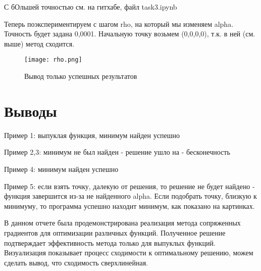 \documentclass{article}
\begin{document}
С бОльшей точностью см. на гитхабе, файл task3.ipynb


Теперь поэкспериментируем с шагом rho, на который мы изменяем alpha.
Точность будет задана 0,0001.
Начальную точку возьмем (0,0,0,0), т.к. в ней (см. выше) метод сходится.

\begin{figure}[H]
    \centering
    \texttt{[image: rho.png]}
    \caption{Вывод только успешных результатов}
\end{figure}


\newpage
\section{Выводы}
Пример 1: выпуклая функция, минимум найден успешно

Пример 2,3: минимум не был найден - решение ушло на - бесконечность

Пример 4: минимум найден успешно

Пример 5: если взять точку, далекую от решения, то решение не будет найдено - функция завершится из-за не найденного alpha. Если подобрать точку, близкую к минимуму, то программа успешно находит минимум, как показано на картинках.


В данном отчете была продемонстрирована реализация метода сопряженных градиентов для оптимизации различных функций. Полученное решение подтверждает эффективность метода только для выпуклых функций. Визуализация показывает процесс сходимости к оптимальному решению, можем сделать вывод, что сходимость сверхлинейная.
\end{document}
